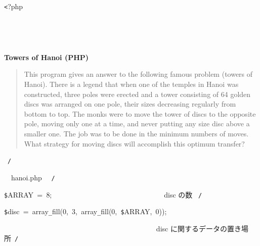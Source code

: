 \documentclass[a4paper,10pt]{article}
\def\mc{\relax}
\begin{document}
\tt\mc 

\noindent
\mbox{}{\tt <}?php

\noindent
\mbox{}\rm\mc {\tt /}{\tt *}\  \hrulefill *
\tt\mc 

\noindent
\mbox{}\hfill

\noindent
\mbox{}\rm\mc \ %

\centerline{\bf Towers of Hanoi (PHP)}

\begin{quote}

This program gives an answer to the following famous problem (towers of
Hanoi).
There is a legend that when one of the temples in Hanoi was constructed,
three poles were erected and a tower consisting of 64 golden discs was
arranged on one pole, their sizes decreasing regularly from bottom to top.
The monks were to move the tower of discs to the opposite pole, moving
only one at a time, and never putting any size disc above a smaller one.
The job was to be done in the minimum numbers of moves. What strategy for
moving discs will accomplish this optimum transfer?
\end{quote}

\tt\mc 

\noindent
\mbox{}\hfill

\noindent
\mbox{}\rm\mc {\tt *} \hrulefill \rm\mc \ {\tt *}{\tt /}
\tt\mc 

\noindent
\mbox{}\hfill

\noindent
\mbox{}\rm\mc {\tt /}{\tt *}\  \hrulefill\ hanoi.php \ \hrulefill \rm\mc \ {\tt *}{\tt /}
\tt\mc 

\noindent
\mbox{}\hfill

\noindent
\mbox{}{\tt\$}ARRAY{\tt\mc \ }={\tt\mc \ }8;{\tt\mc \ }{\tt\mc \ }{\tt\mc \ }{\tt\mc \ }{\tt\mc \ }{\tt\mc \ }{\tt\mc \ }{\tt\mc \ }{\tt\mc \ }{\tt\mc \ }{\tt\mc \ }{\tt\mc \ }{\tt\mc \ }{\tt\mc \ }{\tt\mc \ }{\tt\mc \ }{\tt\mc \ }{\tt\mc \ }{\tt\mc \ }{\tt\mc \ }{\tt\mc \ }{\tt\mc \ }{\tt\mc \ }{\tt\mc \ }{\tt\mc \ }{\tt\mc \ }{\tt\mc \ }{\tt\mc \ }{\tt\mc \ }\rm\mc {\tt /}{\tt *}\  \ disc の数 \hfill \rm\mc \ {\tt *}{\tt /}
\tt\mc 

\noindent
\mbox{}\hfill

\noindent
\mbox{}{\tt\$}disc{\tt\mc \ }={\tt\mc \ }array{\tt\_}fill(0,{\tt\mc \ }3,{\tt\mc \ }array{\tt\_}fill(0,{\tt\mc \ }{\tt\$}ARRAY,{\tt\mc \ }0));

\noindent
\mbox{}{\tt\mc \ }{\tt\mc \ }{\tt\mc \ }{\tt\mc \ }{\tt\mc \ }{\tt\mc \ }{\tt\mc \ }{\tt\mc \ }{\tt\mc \ }{\tt\mc \ }{\tt\mc \ }{\tt\mc \ }{\tt\mc \ }{\tt\mc \ }{\tt\mc \ }{\tt\mc \ }{\tt\mc \ }{\tt\mc \ }{\tt\mc \ }{\tt\mc \ }{\tt\mc \ }{\tt\mc \ }{\tt\mc \ }{\tt\mc \ }{\tt\mc \ }{\tt\mc \ }{\tt\mc \ }{\tt\mc \ }{\tt\mc \ }{\tt\mc \ }{\tt\mc \ }{\tt\mc \ }{\tt\mc \ }{\tt\mc \ }{\tt\mc \ }{\tt\mc \ }{\tt\mc \ }{\tt\mc \ }{\tt\mc \ }{\tt\mc \ }\rm\mc {\tt /}{\tt *}\  \ disc に関するデータの置き場所\hfill \rm\mc \ {\tt *}{\tt /}
\tt\mc 
\end{document}
